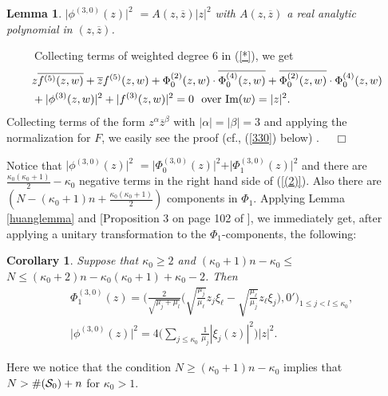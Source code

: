 \documentclass[12pt]{article}
\numberwithin{equation}{section}
\def\ov{\overline}
\newtheorem{lemma}[theorem]{Lemma}
\newtheorem{Corollary}[theorem]{Corollary}
\begin{document}
\medskip
\begin{lemma}
\label{lemma 2} $\vert \phi^{(3,0)}(z) \vert^2$ $  = A(z, \ov
z)\vert z\vert^2$ with $A(z, \ov z)$ a real analytic polynomial  in
$(z,\ov{z})$.
\end{lemma}


\ \ \ \ \ Collecting terms of weighted degree
$6$ in (\ref{*}), we get
\begin{equation}\begin{split}
&z \ov{f^{(5)}(z,w)} + \ov z f^{(5)}(z,w) + \Phi^{(2)}_0(z,w)\cdot
\ov{\Phi^{(4)}_0(z,w)} + \ov{\Phi^{(2)}_0(z,w)}\cdot \Phi^{(4)}_0(z,w)\\
& + | \phi^{(3)}(z,w)|^2 + |f^{(3)}(z,w)|^2=0\ \ \hbox{over}\
\text{Im}(w)=|z|^2.
\end{split}\end{equation}
Collecting terms of the form $z^\alpha \ov
z^\beta$ with $|\alpha|=|\beta|=3$ and applying the normalization
for $F$, we easily see  the proof (cf., (\ref{330}) below) . \ \
$\Box$

\medskip



Notice that $\vert \phi^{(3,0)}(z) \vert^2$ $=\vert
\Phi_0^{(3,0)}(z) \vert^2 +\vert \Phi_1^{(3,0)}(z) \vert^2$ and
there are $\frac{\kappa_0(\kappa_0+1)}{2}-\kappa_0$ negative terms
in the right hand side of (\ref{(2)}). Also there are
$(N-(\kappa_0+1)n+\frac{\kappa_0(\kappa_0+1)}{2})$ components in
$\Phi_1$. Applying  Lemma \ref{huanglemma} and [Proposition 3 on
page 102 of \cite{DA}], we immediately get, after applying a unitary
transformation to the $\Phi_1$-components, the following:

\medskip
\begin{Corollary}\label{hjy1}
\label{lemma 3} Suppose that $\kappa_0\ge 2$ and
{$(\kappa_0+1)n-\kappa_0\le$} $N\le (\kappa_0+2)n -
\kappa_0(\kappa_0+1)+\kappa_0-2$. Then
\begin{equation}\begin{split}
&\Phi^{(3,0)}_1(z)=\Big
(\frac{2}{\sqrt{\mu_j+\mu_l}}\big(\sqrt{\frac{\mu_j}{\mu_\ell}} z_j
\xi_\ell -\sqrt{ \frac{\mu_\ell}{\mu_j}} z_\ell \xi_j\big),
0'\Big)_{1\le j  < l \le \kappa_0}, \\
&  \vert \phi^{(3,0)}(z)\vert^2 = 4\Big(\sum_{j\le \kappa_0}
\frac{1}{\mu_j} |\xi_j(z)|^2 \Big) |z|^2.
\end{split}\end{equation}
\end{Corollary}

Here we notice that the condition $N\ge (\kappa_0+1)n-\kappa_0$
implies that $N>\#({\cal S}_0)+n$ for $\kappa_0>1$.
\end{document}
